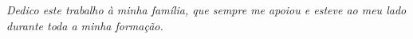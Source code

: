 \begin{dedicatoria}
   \vspace*{\fill}
   \centering
   \noindent
   \textit{Dedico este trabalho à minha família, que sempre me apoiou e esteve ao meu lado durante toda a minha formação.} \vspace*{\fill}
\end{dedicatoria}
